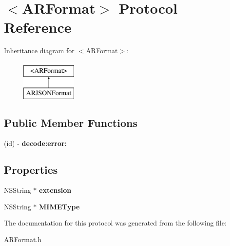 \hypertarget{protocol_a_r_format-p}{
\section{$<$\-A\-R\-Format$>$ \-Protocol \-Reference}
\label{protocol_a_r_format-p}
}
\-Inheritance diagram for $<$\-A\-R\-Format$>$\-:\begin{figure}[H]
\begin{center}
\leavevmode
\includegraphics[height=2.000000cm]{protocol_a_r_format-p}
\end{center}
\end{figure}
\subsection*{\-Public \-Member \-Functions}
\begin{DoxyCompactItemize}
\item 
\hypertarget{protocol_a_r_format-p_a098607d2f1ef2eae36c8b84739acf8ab}{
(id) -\/ {\bfseries decode\-:error\-:}}
\label{protocol_a_r_format-p_a098607d2f1ef2eae36c8b84739acf8ab}

\end{DoxyCompactItemize}
\subsection*{\-Properties}
\begin{DoxyCompactItemize}
\item 
\hypertarget{protocol_a_r_format-p_a989116d2fad841d0be2c3b3eb6bfb7a2}{
\-N\-S\-String $\ast$ {\bfseries extension}}
\label{protocol_a_r_format-p_a989116d2fad841d0be2c3b3eb6bfb7a2}

\item 
\hypertarget{protocol_a_r_format-p_a9a813454eaf1aed359c5ee60457ad78b}{
\-N\-S\-String $\ast$ {\bfseries \-M\-I\-M\-E\-Type}}
\label{protocol_a_r_format-p_a9a813454eaf1aed359c5ee60457ad78b}

\end{DoxyCompactItemize}


\-The documentation for this protocol was generated from the following file\-:\begin{DoxyCompactItemize}
\item 
\-A\-R\-Format.\-h\end{DoxyCompactItemize}
